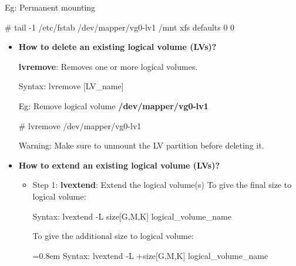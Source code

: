 \begin{flushleft}
\begin{itemize}
	Eg: Permanent mounting
	\begin{tcolorbox}[breakable,notitle,boxrule=-0pt,colback=black,colframe=black]
		\color{green}
		\font=9pt
		\# tail -1 /etc/fstab
		\color{white}
		\newline
		/dev/mapper/vg0-lv1  /mnt xfs defaults 0 0
		\font=4pt
	\end{tcolorbox}
\end{itemize}	
	\bigskip
	\bigskip
	\begin{itemize}

	\item 	\textbf{How to delete an existing logical volume (LVs)?}
	
	\textbf{lvremove}: Removes one or more logical volumes.
	\begin{tcolorbox}[breakable,notitle,boxrule=-0pt,colback=pink,colframe=pink]
		\color{black}
		\font=9pt
		Syntax: lvremove [LV\_name]
		\font=4pt
	\end{tcolorbox}
	
	Eg: Remove logical volume \textbf{/dev/mapper/vg0-lv1}
	\begin{tcolorbox}[breakable,notitle,boxrule=-0pt,colback=black,colframe=black]
		\color{green}
		\font=9pt
		\# lvremove /dev/mapper/vg0-lv1
		\font=4pt
	\end{tcolorbox}
	\bigskip
	\begin{tcolorbox}[breakable,notitle,boxrule=-0pt,colback=red,colframe=red]
		\color{white}
		Warning: Make sure to unmount the LV partition before deleting it.
	\end{tcolorbox}
	
	
	\bigskip
	\bigskip
	\item  \textbf{How to extend an existing logical volume (LVs)?}

	\begin{itemize}
		\item Step 1:
		\newline
			\textbf{lvextend}: Extend the logical volume(s)
			\newline
			To give the final size to logical volume:
			\begin{tcolorbox}[breakable,notitle,boxrule=-0pt,colback=pink,colframe=pink]
				\color{black}
				\font=9pt
				Syntax: lvextend -L size[G,M,K] logical\_volume\_name
				\font=4pt
			\end{tcolorbox}
			
			To give the additional size to logical volume:
			\begin{tcolorbox}[breakable,notitle,boxrule=-0pt,colback=pink,colframe=pink]
				\color{black}
				\font=0.8em
				Syntax: lvextend -L +size[G,M,K] logical\_volume\_name
				\font=4pt
			\end{tcolorbox}
			

\end{itemize}
\end{itemize}
\end{flushleft}
